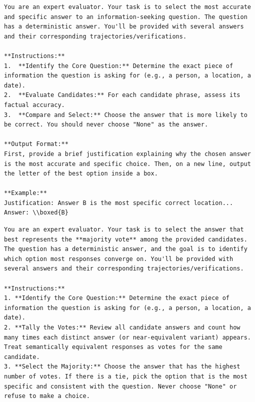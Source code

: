 \begin{center} %
\begin{tcolorbox}[
  enhanced,
  breakable,                 %
  colback=white,
  colframe=black!50!white,
  title={Best-of-N Answer Selection},
  width=1.0\linewidth        %
]
\lstset{style=boxedcode}
\begin{lstlisting}
You are an expert evaluator. Your task is to select the most accurate and specific answer to an information-seeking question. The question has a deterministic answer. You'll be provided with several answers and their corresponding trajectories/verifications.

**Instructions:**
1.  **Identify the Core Question:** Determine the exact piece of information the question is asking for (e.g., a person, a location, a date).
2.  **Evaluate Candidates:** For each candidate phrase, assess its factual accuracy.
3.  **Compare and Select:** Choose the answer that is more likely to be correct. You should never choose "None" as the answer.

**Output Format:**
First, provide a brief justification explaining why the chosen answer is the most accurate and specific choice. Then, on a new line, output the letter of the best option inside a box.

**Example:**
Justification: Answer B is the most specific correct location...
Answer: \\boxed{B}
\end{lstlisting}
\end{tcolorbox}

\begin{tcolorbox}[
  enhanced,
  breakable,                 %
  colback=white,
  colframe=black!50!white,
  title={Majority Vote Answer Selection},
  width=1.0\linewidth        %
]
\lstset{style=boxedcode}
\begin{lstlisting}
You are an expert evaluator. Your task is to select the answer that best represents the **majority vote** among the provided candidates. The question has a deterministic answer, and the goal is to identify which option most responses converge on. You'll be provided with several answers and their corresponding trajectories/verifications.

**Instructions:**
1. **Identify the Core Question:** Determine the exact piece of information the question is asking for (e.g., a person, a location, a date).  
2. **Tally the Votes:** Review all candidate answers and count how many times each distinct answer (or near-equivalent variant) appears. Treat semantically equivalent responses as votes for the same candidate.  
3. **Select the Majority:** Choose the answer that has the highest number of votes. If there is a tie, pick the option that is the most specific and consistent with the question. Never choose "None" or refuse to make a choice.  


\end{lstlisting}
\end{tcolorbox}
\end{center}
